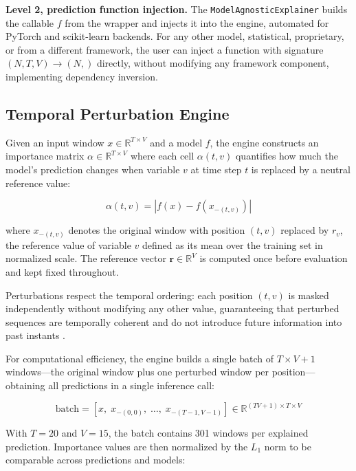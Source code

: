 \documentclass[runningheads]{llncs}
\begin{document}
\textbf{Level 2, prediction function injection.} The
\texttt{ModelAgnosticExplainer} builds the callable $f$ from the
wrapper and injects it into the engine, automated for PyTorch and
scikit-learn backends. For any other model, statistical, proprietary,
or from a different framework, the user can inject a function with
signature $(N, T, V) \rightarrow (N,)$ directly, without modifying
any framework component, implementing dependency inversion.

\subsection{Temporal Perturbation Engine}

Given an input window $x \in \mathbb{R}^{T \times V}$ and a model
$f$, the engine constructs an importance matrix
$\alpha \in \mathbb{R}^{T \times V}$ where each cell $\alpha(t, v)$
quantifies how much the model's prediction changes when variable $v$
at time step $t$ is replaced by a neutral reference value:

\begin{equation}
    \alpha(t, v) = \left| f(x) - f(x_{-(t,v)}) \right|
\end{equation}

where $x_{-(t,v)}$ denotes the original window with position
$(t, v)$ replaced by $r_v$, the reference value of variable $v$
defined as its mean over the training set in normalized scale. The
reference vector $\mathbf{r} \in \mathbb{R}^V$ is computed once
before evaluation and kept fixed throughout.

Perturbations respect the temporal ordering: each position $(t, v)$
is masked independently without modifying any other value,
guaranteeing that perturbed sequences are temporally coherent and
do not introduce future information into past instants
\cite{tonekaboni2020,crabbe2021}.

For computational efficiency, the engine builds a single batch of
$T \times V + 1$ windows---the original window plus one perturbed
window per position---obtaining all predictions in a single
inference call:

\begin{equation}
    \text{batch} = \left[ x,\; x_{-(0,0)},\; \ldots,\;
    x_{-(T-1,V-1)} \right] \in
    \mathbb{R}^{(TV+1) \times T \times V}
\end{equation}

With $T=20$ and $V=15$, the batch contains 301 windows per
explained prediction. Importance values are then normalized by the
$L_1$ norm to be comparable across predictions and models:
\end{document}
